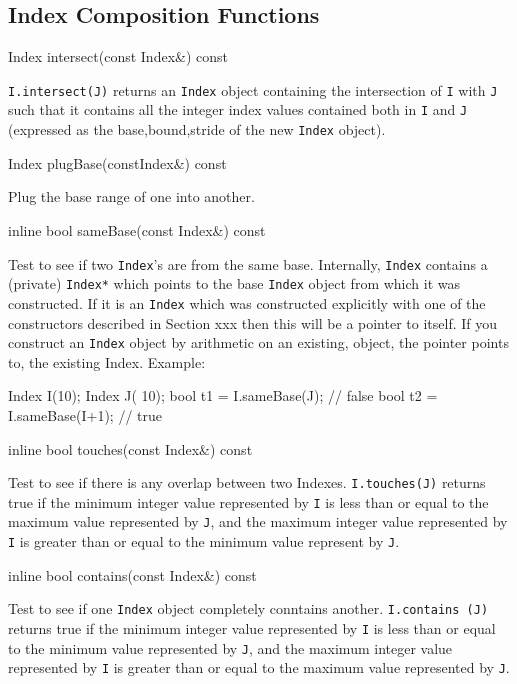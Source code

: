 \subsection{Index Composition Functions}
\begin{smallcode}
Index intersect(const Index&) const
\end{smallcode} 
\texttt{I.intersect(J)} returns an \texttt{Index} object containing the intersection of \texttt{I} with \texttt{J}  such that it contains all the integer index values contained both in \texttt{I} and \texttt{J} (expressed as the 
	{base,bound,stride} of the new \texttt{Index} object).
\begin{smallcode}
Index plugBase(constIndex&) const
\end{smallcode} 
Plug the base range of one into another. 
\begin{smallcode}
inline bool sameBase(const Index&) const 
\end{smallcode}
Test to see if two \texttt{Index}'s are from the same base. Internally, \texttt{Index} contains a (private) \texttt{Index*} which points to the base \texttt{Index} object from which it was constructed. If it is an \texttt{Index}
which was constructed explicitly with one of the constructors described in Section xxx then this will be a pointer to itself. If you construct an \texttt{Index} object by arithmetic on an existing, object, the pointer points to, the existing Index. Example:
\begin{smallcode}
Index I(10);
Index J( 10); 
bool t1 = I.sameBase(J);     // false 
bool t2 = I.sameBase(I+1); // true 
\end{smallcode}
\begin{smallcode}
inline bool touches(const Index&) const 
\end{smallcode}
Test to see if there is any overlap between two Indexes. \texttt{I.touches(J)} returns true if the minimum integer value represented by \texttt{I} is less than or equal to the maximum value represented by
\texttt{J}, and the maximum integer value represented by \texttt{I} is greater than or equal to the minimum value represent by \texttt{J}. 
\begin{smallcode}
inline bool contains(const Index&) const
\end{smallcode}
Test to see if one \texttt{Index} object completely conntains another. \texttt{I.contains (J)} returns true if the minimum integer value represented by \texttt{I} is less than or equal to the minimum value represented by \texttt{J}, and the maximum integer value represented by \texttt{I} is greater than or equal to the maximum value represented by \texttt{J}. 
